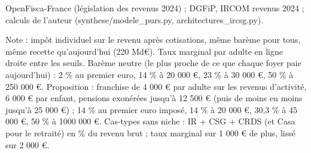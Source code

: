OpenFisca-France (législation des revenus 2024) ; DGFiP, IRCOM revenus 2024 ; calculs de l'auteur (synthese/modele\_purs.py, architectures\_ircsg.py).\par Note : impôt individuel sur le revenu après cotisations, même barème pour tous, même recette qu'aujourd'hui (220 Md\euro{}). Taux marginal par adulte en ligne droite entre les seuils. Barème neutre (le plus proche de ce que chaque foyer paie aujourd'hui) : 2 \% au premier euro, 14 \% à 20 000 \euro{}, 23 \% à 30 000 \euro{}, 50 \% à 250 000 \euro{}. Proposition : franchise de 4 000 \euro{} par adulte sur les revenus d'activité, 6 000 \euro{} par enfant, pensions exonérées jusqu'à 12 500 \euro{} (puis de moins en moins jusqu'à 25 000 \euro{}) ; 14 \% au premier euro imposé, 14 \% à 20 000 \euro{}, 30,3 \% à 45 000 \euro{}, 50 \% à 1000 000 \euro{}. Cas-types sans niche : IR + CSG + CRDS (et Casa pour le retraité) en \% du revenu brut ; taux marginal sur 1 000 \euro{} de plus, lissé sur 2 000 \euro{}.
